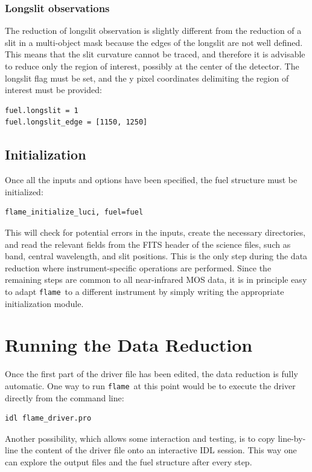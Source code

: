 \documentclass[a4paper, notitlepage]{article}
\newcommand{\flame}{\texttt{flame}}
\begin{document}
\subsubsection{Longslit observations}

The reduction of longslit observation is slightly different from the reduction of a slit in a multi-object mask because the edges of the longslit are not well defined. This means that the slit curvature cannot be traced, and therefore it is advisable to reduce only the region of interest, possibly at the center of the detector. The longslit flag must be set, and the y pixel coordinates delimiting the region of interest must be provided:
\begin{lstlisting}
fuel.longslit = 1
fuel.longslit_edge = [1150, 1250]
\end{lstlisting}



\subsection{Initialization}

Once all the inputs and options have been specified, the fuel structure must be initialized:
\begin{lstlisting}
flame_initialize_luci, fuel=fuel
\end{lstlisting}
This will check for potential errors in the inputs, create the necessary directories, and read the relevant fields from the FITS header of the science files, such as band, central wavelength, and slit positions. This is the only step during the data reduction where instrument-specific operations are performed. Since the remaining steps are common to all near-infrared MOS data, it is in principle easy to adapt \flame\ to a different instrument by simply writing the appropriate initialization module.






\section{Running the Data Reduction}

Once the first part of the driver file has been edited, the data reduction is fully automatic. One way to run \flame\ at this point would be to execute the driver directly from the command line:
\begin{lstlisting}
idl flame_driver.pro
\end{lstlisting}
Another possibility, which allows some interaction and testing, is to copy line-by-line the content of the driver file onto an interactive IDL session. This way one can explore the output files and the fuel structure after every step.
\end{document}
